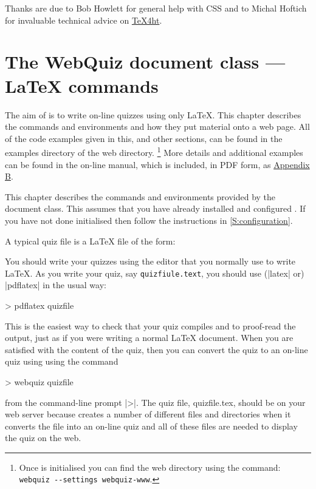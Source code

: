 \documentclass[svgnames]{article}
\newcommand\TeXfht{\href{https://www.ctan.org/tex4ht}{TeX4ht}\xspace}
\begin{document}
   Thanks are due to Bob Howlett for general help with CSS and to
   Michal Hoftich for invaluable technical advice on \TeXfht.

 \section{The WebQuiz document class --- \LaTeX{} commands}
 \label{S:documentclass}

  The aim of \WebQuiz is to write on-line quizzes using only \LaTeX.
  This chapter describes the \WebQuiz commands and environments and how
  they put material onto a web page.  All of the code examples given in
  this, and other sections, can be found in the \textsf{examples}
  directory of the \WebQuiz web directory.%
  \footnote{Once \WebQuiz is initialised you can find the \WebQuiz web
  directory using the command:\newline
  \hspace*{10mm}\lstinline[style=bashcode]|webquiz --settings webquiz-www|.}
  More details and additional examples can be found in the on-line manual,
  which is included, in PDF form, as \hyperref[S:online]{Appendix B}.

  This chapter describes the commands and environments provided by the
  \WebQuiz document class. This assumes that you have already installed
  and configured \WebQuiz. If you have not done initialised \WebQuiz
  then follow the instructions in \autoref{S:configuration}.

  A typical \WebQuiz quiz file is a \LaTeX{} file of the form:


  \noindent You should write your quizzes using the editor that you
  normally use to write \LaTeX. As you write your quiz, say
  \texttt{quizfiule.text}, you should use (\BashCode|latex| or)
  \BashCode|pdflatex| in the usual way:
  \begin{bashcode}
      > pdflatex quizfile
  \end{bashcode}
  This is the easiest way to check that your quiz compiles and to
  proof-read the output, just as if you were writing a normal
  \LaTeX{} document. When you are satisfied with the content of the
  quiz, then you can convert the quiz to an on-line quiz using \WebQuiz
  using the command
  \begin{bashcode}
     > webquiz quizfile
  \end{bashcode}
  from the command-line prompt \BashCode|>|. The quiz file,
  \textsf{quizfile.tex}, should be on your web server because \WebQuiz
  creates a number of different files and directories when it converts
  the file into an on-line quiz and all of these files are needed to
  display the quiz on the web.
\end{document}
